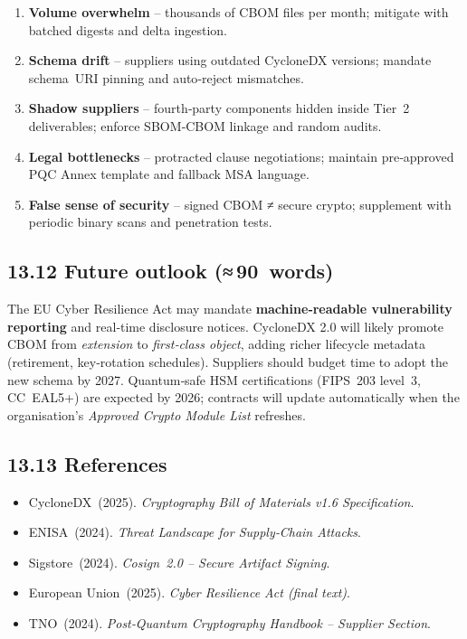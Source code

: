 \documentclass[
  english,
]{article}
\providecommand{\tightlist}{%
  \setlength{\itemsep}{0pt}\setlength{\parskip}{0pt}}
\begin{document}
\begin{enumerate}
\def\labelenumi{\arabic{enumi}.}
\tightlist
\item
  \textbf{Volume overwhelm} -- thousands of CBOM files per month;
  mitigate with batched digests and delta ingestion.
\item
  \textbf{Schema drift} -- suppliers using outdated CycloneDX versions;
  mandate schema~URI pinning and auto‑reject mismatches.
\item
  \textbf{Shadow suppliers} -- fourth‑party components hidden inside
  Tier~2 deliverables; enforce SBOM‑CBOM linkage and random audits.
\item
  \textbf{Legal bottlenecks} -- protracted clause negotiations; maintain
  pre‑approved PQC Annex template and fallback MSA language.
\item
  \textbf{False sense of security} -- signed CBOM ≠ secure crypto;
  supplement with periodic binary scans and penetration tests.
\end{enumerate}

\subsection{13.12 Future outlook
(≈\,90~words)}\label{future-outlook-90-words}

The EU Cyber Resilience Act may mandate \textbf{machine‑readable
vulnerability reporting} and real‑time disclosure notices. CycloneDX 2.0
will likely promote CBOM from \emph{extension} to \emph{first‑class
object}, adding richer lifecycle metadata (retirement, key‑rotation
schedules). Suppliers should budget time to adopt the new schema by
2027. Quantum‑safe HSM certifications (FIPS~203 level~3, CC~EAL5+) are
expected by 2026; contracts will update automatically when the
organisation's \emph{Approved Crypto Module List} refreshes.

\subsection{13.13 References}\label{references-5}

\begin{itemize}
\tightlist
\item
  CycloneDX~(2025). \emph{Cryptography Bill of Materials v1.6
  Specification}.
\item
  ENISA~(2024). \emph{Threat Landscape for Supply‑Chain Attacks}.
\item
  Sigstore~(2024). \emph{Cosign~2.0 -- Secure Artifact Signing}.
\item
  European Union~(2025). \emph{Cyber Resilience Act (final text)}.
\item
  TNO~(2024). \emph{Post‑Quantum Cryptography Handbook -- Supplier
  Section}.
\end{itemize}
\end{document}
